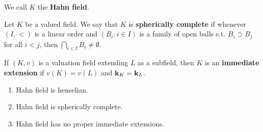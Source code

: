 \documentclass[11pt]{article}
\begin{document}
We call \(K\) the \textbf{Hahn field}.

\begin{definition}[]
Let \(K\) be a valued field. We say that \(K\) is \textbf{spherically complete} if whenever \((I,<)\) is
a linear order and \((B_i:i\in I)\) is a family of open balls s.t. \(B_i\supset B_j\) for all \(i<j\),
then \(\bigcap_{i\in I}B_i\neq\emptyset\).
\end{definition}

\begin{definition}[]
If \((K,v)\) is a valuation field extending \(L\) as a subfield, then \(K\) is an \textbf{immediate
extension} if \(v(K)=v(L)\) and \(\operatorname{\textbf{k}}_K=\operatorname{\textbf{k}}_L\).
\end{definition}


\begin{fact}[]
\begin{enumerate}
\item Hahn field is henselian.
\item Hahn field is spherically complete.
\item Hahn field has no proper immediate extensions.
\end{enumerate}
\end{fact}
\end{document}
